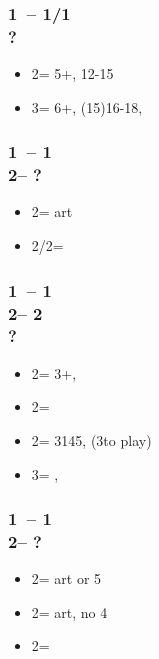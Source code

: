 \documentclass[12pt, a4paper]{article}
\begin{document}
\subsubsection*{1\clubs\ -- 1\hearts/1\spades \\ ?}
\begin{itemize}
    \item 2\clubs = 5+\clubs, 12-15 \unbal
    \item 3\clubs = 6+\clubs, (15)16-18, \unbal
\end{itemize}

\subsubsection*{1\clubs\ -- 1\hearts \\ 
                2\clubs -- ?}
\begin{itemize}
    \item 2\diams = \inv art \vimp
    \item 2\spades/2\nt = \gf
\end{itemize}

\subsubsection*{1\clubs\ -- 1\hearts \\ 
                2\clubs -- 2\diams\\
                ?}
\begin{itemize}
    \item 2\hearts = 3+\hearts, \fonce
    \item 2\spades = \gf
    \item 2\nt = 3145, \nf (3\diams to play)
    \item 3\clubs = \nat, \nf
\end{itemize}

\subsubsection*{1\clubs\ -- 1\spades \\ 
                2\clubs -- ?}
\begin{itemize}
    \item 2\diams = \inv art or 5\hearts \gf \vimp
    \item 2\hearts = \gf art, no 4\hearts \vimp
    \item 2\nt = \gf
\end{itemize}
\end{document}
